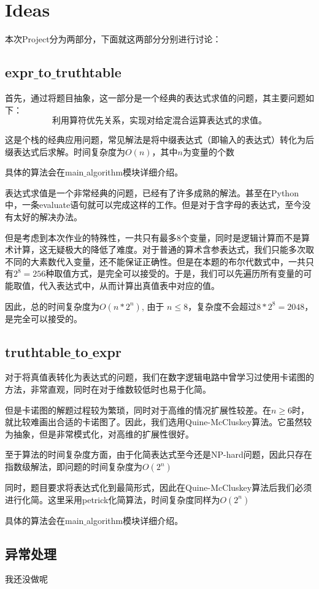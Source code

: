 \section{Ideas}

本次Project分为两部分，下面就这两部分分别进行讨论：

\subsection{expr$\_$to$\_$truthtable}
	首先，通过将题目抽象，这一部分是一个经典的表达式求值的问题，其主要问题如下：
		$$\mbox{利用算符优先关系，实现对给定混合运算表达式的求值。}$$
		
	这是个栈的经典应用问题，常见解法是将中缀表达式（即输入的表达式）转化为后缀表达式后求解。时间复杂度为$O(n)$，其中$n$为变量的个数
	
	具体的算法会在main$\_$algorithm模块详细介绍。
	
	表达式求值是一个非常经典的问题，已经有了许多成熟的解法。甚至在Python中，一条evaluate语句就可以完成这样的工作。但是对于含字母的表达式，至今没有太好的解决办法。
	
	但是考虑到本次作业的特殊性，一共只有最多8个变量，同时是逻辑计算而不是算术计算，这无疑极大的降低了难度。对于普通的算术含参表达式，我们只能多次取不同的大素数代入变量，还不能保证正确性。但是在本题的布尔代数式中，一共只有$2 ^ 8 = 256$种取值方式，是完全可以接受的。于是，我们可以先遍历所有变量的可能取值，代入表达式中，从而计算出真值表中对应的值。
	
	因此，总的时间复杂度为$O(n * 2 ^ n)$, 由于 $n \le 8$，复杂度不会超过$8 * 2 ^ 8 = 2048$，是完全可以接受的。
\subsection{truthtable$\_$to$\_$expr}

	对于将真值表转化为表达式的问题，我们在数字逻辑电路中曾学习过使用卡诺图的方法，非常直观，同时在对于维数较低时也易于化简。
	
	但是卡诺图的解题过程较为繁琐，同时对于高维的情况扩展性较差。在$n \geq 6$时，就比较难画出合适的卡诺图了。因此，我们选用Quine-McCluskey算法。它虽然较为抽象，但是非常模式化，对高维的扩展性很好。
	
	至于算法的时间复杂度方面，由于化简表达式至今还是NP-hard问题，因此只存在指数级解法，即问题的时间复杂度为$O(2 ^ n)$
	
	同时，题目要求将表达式化到最简形式，因此在Quine-McCluskey算法后我们必须进行化简。这里采用petrick化简算法，时间复杂度同样为$O(2 ^ n)$
	
	具体的算法会在main$\_$algorithm模块详细介绍。

\subsection{异常处理}
	我还没做呢